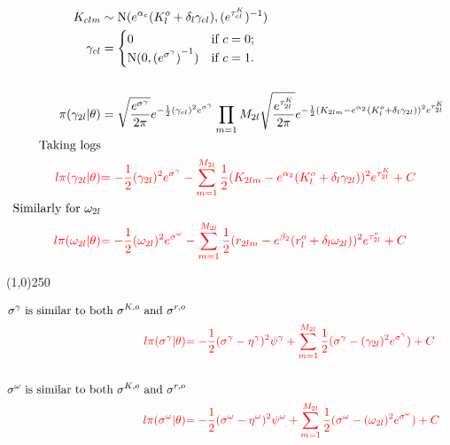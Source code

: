\begin{align*}
K_{clm} &\sim \operatorname{N}(e^{\alpha_{c}}(K_{l}^o+\delta_{l}\gamma_{cl}),(e^{ \tau_{cl}^K })^{-1})\\
\gamma_{cl}&=\begin{cases}
0  & \text{if } c=0;\\
\operatorname{N}(0,{(e^{\sigma^{\gamma}})}^{-1}) & \text{if } c=1.
\end{cases}\\
\\
\pi(\gamma_{2l}|\theta)&=\sqrt{\frac{e^{\sigma^{\gamma}}}{2\pi}} e^{-\frac{1}{2}(\gamma_{cl})^{2}e^{\sigma^{\gamma}} }
\prod_{m=1}{M_{2l}}
\sqrt{\frac{e^{ \tau_{2l}^K }}{2\pi}} e^{-\frac{1}{2}(K_{2lm}-e^{\alpha_{2}}(K_{l}^o+\delta_{l}\gamma_{2l}))^{2} e^{ \tau_{2l}^K }}\\
\text{Taking logs}\\
\color{red}{l\pi(\gamma_{2l}|\theta)}&
\color{red}{
=-\frac{1}{2}(\gamma_{2l})^{2}e^{\sigma^{\gamma}}
-
\sum_{m=1}^{M_{2l}}\frac{1}{2}(K_{2lm}-e^{\alpha_{2}}(K_{l}^o+\delta_{l}\gamma_{2l}))^{2}e^{\tau_{2l}^K}
+C
}\\
\text{Similarly for $\omega_{2l}$}\\
\color{red}{l\pi(\omega_{2l}|\theta)}&
\color{red}{
=-\frac{1}{2}(\omega_{2l})^{2}e^{\sigma^{\omega}}
-
\sum_{m=1}^{M_{2l}}\frac{1}{2}(r_{2lm}-e^{\beta_{2}}(r_{l}^o+\delta_{l}\omega_{2l}))^{2}e^{\tau_{2l}^r}
+C
}
\end{align*}

\begin{center}
\line(1,0){250}
\end{center}

\begin{align*}
\text{$\sigma^{\gamma}$ is similar to both $\sigma^{K,o}$ and $\sigma^{r,o}$}\\
\color{red}{l\pi(\sigma^{\gamma}|\theta)}&
\color{red}{
=-\frac{1}{2}(\sigma^{\gamma}-\eta^{\gamma})^{2}\psi^{\gamma} 
+
\sum_{m=1}^{M_{2l}}\frac{1}{2}(\sigma^{\gamma}-(\gamma_{2l})^{2}e^{\sigma^{\gamma}})
+C
}\\
\\
\text{$\sigma^{\omega}$ is similar to both $\sigma^{K,o}$ and $\sigma^{r,o}$}\\
\color{red}{l\pi(\sigma^{\omega}|\theta)}&
\color{red}{
=-\frac{1}{2}(\sigma^{\omega}-\eta^{\omega})^{2}\psi^{\omega} 
+
\sum_{m=1}^{M_{2l}}\frac{1}{2}(\sigma^{\omega}-(\omega_{2l})^{2}e^{\sigma^{\omega}})
+C
}
\end{align*}

